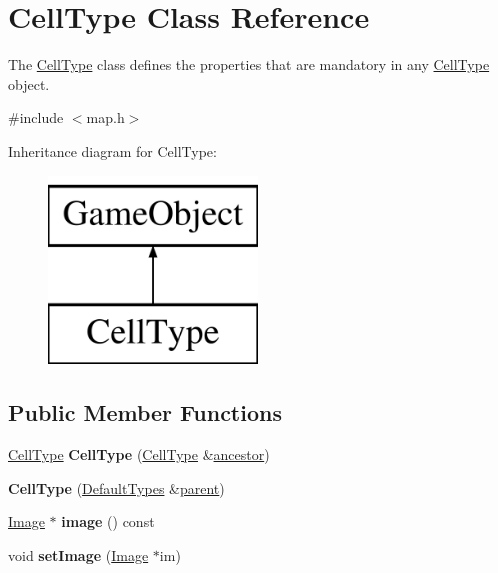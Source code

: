 \hypertarget{class_cell_type}{\section{\-Cell\-Type \-Class \-Reference}
\label{class_cell_type}
}


\-The \hyperlink{class_cell_type}{\-Cell\-Type} class defines the properties that are mandatory in any \hyperlink{class_cell_type}{\-Cell\-Type} object.  




{\ttfamily \#include $<$map.\-h$>$}

\-Inheritance diagram for \-Cell\-Type\-:\begin{figure}[H]
\begin{center}
\leavevmode
\includegraphics[height=5.000000cm]{class_cell_type}
\end{center}
\end{figure}
\subsection*{\-Public \-Member \-Functions}
\begin{DoxyCompactItemize}
\item 
\hypertarget{class_cell_type_a547d7a2e47edfe2e081ad3e876658e67}{\hyperlink{class_cell_type}{\-Cell\-Type} {\bfseries \-Cell\-Type} (\hyperlink{class_cell_type}{\-Cell\-Type} \&\hyperlink{class_inheritable_object_a10eead70368227b7f15f44f91d234fa5}{ancestor})}\label{class_cell_type_a547d7a2e47edfe2e081ad3e876658e67}

\item 
\hypertarget{class_cell_type_a4af772be829a307264a5392655b8bbc1}{{\bfseries \-Cell\-Type} (\hyperlink{class_default_types}{\-Default\-Types} \&\hyperlink{class_game_object_af3deaf39cde23c189765634e32e95bb4}{parent})}\label{class_cell_type_a4af772be829a307264a5392655b8bbc1}

\item 
\hypertarget{class_cell_type_a4dbb3f45c4689f52c4af8cb2d3385d10}{\hyperlink{class_image}{\-Image} $\ast$ {\bfseries image} () const }\label{class_cell_type_a4dbb3f45c4689f52c4af8cb2d3385d10}

\item 
\hypertarget{class_cell_type_ab8288b5497a9d72cc636412aba7b049b}{void {\bfseries set\-Image} (\hyperlink{class_image}{\-Image} $\ast$im)}\label{class_cell_type_ab8288b5497a9d72cc636412aba7b049b}

\end{DoxyCompactItemize}



